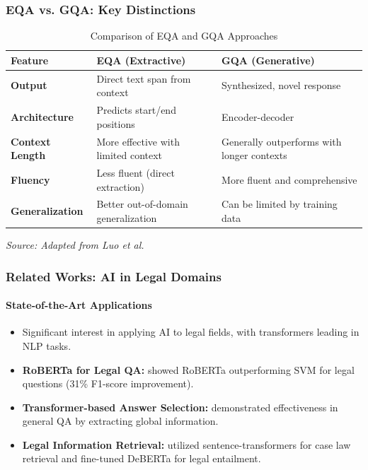\documentclass{beamer}
\begin{document}
\begin{frame}
    \frametitle{EQA vs. GQA: Key Distinctions}
    \begin{table}[h]
        \centering
        \small
        \caption{Comparison of EQA and GQA Approaches}
        \label{tab:eqa-gqa-comparison}
        \begin{tabular}{p{}p{}p{}}
            \toprule
            \textbf{Feature} & \textbf{\ac{EQA} (Extractive)} & \textbf{\ac{GQA} (Generative)} \\
            \midrule
            \textbf{Output} & Direct text span from context & Synthesized, novel response \\
            \textbf{Architecture} & Predicts start/end positions & Encoder-decoder \\
            \textbf{Context Length} & More effective with limited context & Generally outperforms with longer contexts \\
            \textbf{Fluency} & Less fluent (direct extraction) & More fluent and comprehensive \\
            \textbf{Generalization} & Better out-of-domain generalization & Can be limited by training data \\
            \bottomrule
        \end{tabular}
        \vspace{0.2cm}
        \justifying \footnotesize \textit{Source: Adapted from Luo et al. \cite{Luo2022NLP}}
    \end{table}
\end{frame}

\begin{frame}
    \frametitle{Related Works: AI in Legal Domains}
    \framesubtitle{State-of-the-Art Applications}
    \begin{itemize}
        \item Significant interest in applying \ac{AI} to legal fields, with transformers leading in \ac{NLP} tasks.
        \item \textbf{RoBERTa for Legal \ac{QA}:} \cite{Vold_Conrad_2021} showed RoBERTa outperforming \ac{SVM} for legal questions (31\% F1-score improvement).
        \item \textbf{Transformer-based Answer Selection:} \cite{Shao_Guo_Chen_Zepeng_2019} demonstrated effectiveness in general \ac{QA} by extracting global information.
        \item \textbf{Legal Information Retrieval:} \cite{Kim_Rabelo_Babiker_Rahman_Goebel_2024} utilized sentence-transformers for case law retrieval and fine-tuned DeBERTa for legal entailment.
    \end{itemize}
\end{frame}
\end{document}
